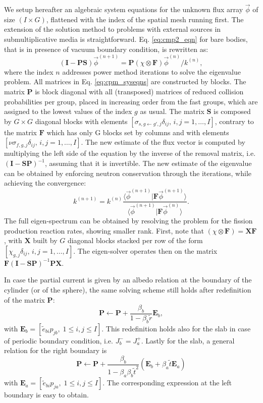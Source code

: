 \documentclass{ictt26}
\begin{document}
We setup hereafter an algebraic system equations for the unknown flux array $\vec{\phi}$ of size $(I \times G)$, flattened with the index of the spatial mesh running first. The extension of the solution method to problems with external sources in submultiplicative media is straightforward. Eq. \ref{eq:cmp2_eqn} for bare bodies, that is in presence of vacuum boundary condition, is rewritten as:
\begin{equation}
\label{eq:cpm_syseqns}
(\mathbf{I} - \mathbf{P}\mathbf{S}) \vec{\phi}^{(n+1)} = \mathbf{P} (\chi \otimes \mathbf{F}) \vec{\phi}^{(n)} / k^{(n)},
\end{equation}
where the index $n$ addresses power method iterations to solve the eigenvalue problem. All matrices in Eq. \ref{eq:cpm_syseqns} are constructed by blocks. The matrix $\mathbf{P}$ is block diagonal with all (transposed) matrices of reduced collision probabilities per group, placed in increasing order from the fast groups, which are assigned to the lowest values of the index $g$ as usual. The matrix $\mathbf{S}$ is composed by $G \times G$ diagonal blocks with elements $[\sigma_{s, g \leftarrow g',j}\delta_{ij}, \, i, j=1, \ldots, I]$, contrary to the matrix $\mathbf{F}$ which has only G blocks set by columns and with elements $[\nu\sigma_{f, g, j}\delta_{ij}, \, i, j=1, \ldots, I]$. The new estimate of the flux vector is computed by multiplying the left side of the equation by the inverse of the removal matrix, i.e. $(\mathbf{I} - \mathbf{S} \mathbf{P})^{-1}$, assuming that it is invertible. The new estimate of the eigenvalue can be obtained by enforcing neutron conservation through the iterations, while achieving the convergence:
\[
  k^{(n+1)} = k^{(n)}
    \frac{\langle \vec{\phi}^{(n+1)} | \mathbf{F} \vec{\phi}^{(n+1)} \rangle}{\langle \vec{\phi}^{(n+1)} | \mathbf{F} \vec{\phi}^{(n)} \rangle}.
\]
The full eigen-spectrum can be obtained by resolving the problem for the fission production reaction rates, showing smaller rank. First, note that $(\chi \otimes \mathbf{F}) = \mathbf{X} \mathbf{F}$, with $\mathbf{X}$ built by $G$ diagonal blocks stacked per row of the form $[\chi_{g,j}\delta_{ij}, \, i, j=1, \ldots, I]$. The eigen-solver operates then on the matrix $\mathbf{F}(\mathbf{I} - \mathbf{S} \mathbf{P})^{-1} \mathbf{P} \mathbf{X}$.

In case the partial current is given by an albedo relation at the boundary of the cylinder (or of the sphere), the same solving scheme still holds after redefinition of the matrix $\mathbf{P}$:
\[
\mathbf{P} \leftarrow \mathbf{P} + \frac{\beta_b}{1 - \beta_b \tilde{r}} \mathbf{E}_b,
\]
with $\mathbf{E}_b = [\tilde{e}_{bi} p_{jb},\; 1 \leq i,j \leq I]$. This redefinition holds also for the slab in case of periodic boundary condition, i.e. $J_b^- = J_a^+$. Lastly for the slab, a general relation for the right boundary is
\[ \mathbf{P} \leftarrow \mathbf{P} + 
\frac{\beta_b}{1 - \beta_a \beta_b \tilde{t}^2}
\left( \mathbf{E}_b + \beta_a \tilde{t} \mathbf{E}_a \right)
\]
with $\mathbf{E}_a = [\tilde{e}_{bi} p_{ja},\; 1 \leq i,j \leq I]$. The corresponding expression at the left boundary is easy to obtain.

\setlength{\baselineskip}{12pt}


\end{document}
